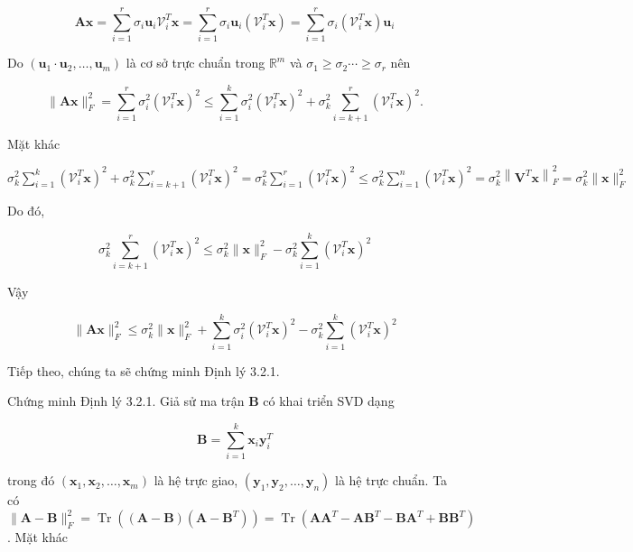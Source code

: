 \documentclass[12pt,a4paper,oneside]{report}
\numberwithin{equation}{section}
\begin{document}
$$
\mathbf{A} \mathbf{x}=\sum_{i=1}^{r} \sigma_{i} \mathbf{u}_{i} \mathcal{V}_{i}^{T} \mathbf{x}=\sum_{i=1}^{r} \sigma_{i} \mathbf{u}_{i}\left(\mathcal{V}_{i}^{T} \mathbf{x}\right)=\sum_{i=1}^{r} \sigma_{i}\left(\mathcal{V}_{i}^{T} \mathbf{x}\right) \mathbf{u}_{i}
$$

Do $\left(\mathbf{u}_{1} \cdot \mathbf{u}_{2}, \ldots, \mathbf{u}_{m}\right)$ là cơ sở trực chuẩn trong $\mathbb{R}^{m}$ và $\sigma_{1} \geqslant \sigma_{2} \cdots \geqslant \sigma_{r}$ nên

$$
\|\mathbf{A} \mathbf{x}\|_{F}^{2}=\sum_{i=1}^{r} \sigma_{i}^{2}\left(\mathcal{V}_{i}^{T} \mathbf{x}\right)^{2} \leqslant \sum_{i=1}^{k} \sigma_{i}^{2}\left(\mathcal{V}_{i}^{T} \mathbf{x}\right)^{2}+\sigma_{k}^{2} \sum_{i=k+1}^{r}\left(\mathcal{V}_{i}^{T} \mathbf{x}\right)^{2} .
$$

Mặt khác

$\sigma_{k}^{2} \sum_{i=1}^{k}\left(\mathcal{V}_{i}^{T} \mathbf{x}\right)^{2}+\sigma_{k}^{2} \sum_{i=k+1}^{r}\left(\mathcal{V}_{i}^{T} \mathbf{x}\right)^{2}=\sigma_{k}^{2} \sum_{i=1}^{r}\left(\mathcal{V}_{i}^{T} \mathbf{x}\right)^{2} \leqslant \sigma_{k}^{2} \sum_{i=1}^{n}\left(\mathcal{V}_{i}^{T} \mathbf{x}\right)^{2}=\sigma_{k}^{2}\left\|\mathbf{V}^{T} \mathbf{x}\right\|_{F}^{2}=\sigma_{k}^{2}\|\mathbf{x}\|_{F}^{2}$

Do đó,

$$
\sigma_{k}^{2} \sum_{i=k+1}^{r}\left(\mathcal{V}_{i}^{T} \mathbf{x}\right)^{2} \leqslant \sigma_{k}^{2}\|\mathbf{x}\|_{F}^{2}-\sigma_{k}^{2} \sum_{i=1}^{k}\left(\mathcal{V}_{i}^{T} \mathbf{x}\right)^{2}
$$

Vậy

$$
\|\mathbf{A} \mathbf{x}\|_{F}^{2} \leqslant \sigma_{k}^{2}\|\mathbf{x}\|_{F}^{2}+\sum_{i=1}^{k} \sigma_{i}^{2}\left(\mathcal{V}_{i}^{T} \mathbf{x}\right)^{2}-\sigma_{k}^{2} \sum_{i=1}^{k}\left(\mathcal{V}_{i}^{T} \mathbf{x}\right)^{2}
$$

Tiếp theo, chúng ta sẽ chứng minh Định lý 3.2.1.

Chứng minh Định lý 3.2.1. Giả sử ma trận $\mathbf{B}$ có khai triển SVD dạng

$$
\mathbf{B}=\sum_{i=1}^{k} \mathbf{x}_{i} \mathbf{y}_{i}^{T}
$$

trong đó $\left(\mathbf{x}_{1}, \mathbf{x}_{2}, \ldots, \mathbf{x}_{m}\right)$ là hệ trực giao, $\left(\mathbf{y}_{1}, \mathbf{y}_{2}, \ldots, \mathbf{y}_{n}\right)$ là hệ trực chuẩn. Ta có $\|\mathbf{A}-\mathbf{B}\|_{F}^{2}=\operatorname{Tr}\left((\mathbf{A}-\mathbf{B})\left(\mathbf{A}-\mathbf{B}^{T}\right)\right)=\operatorname{Tr}\left(\mathbf{A} \mathbf{A}^{T}-\mathbf{A} \mathbf{B}^{T}-\mathbf{B A}^{T}+\mathbf{B B}^{T}\right)$. Mặt khác
\end{document}
